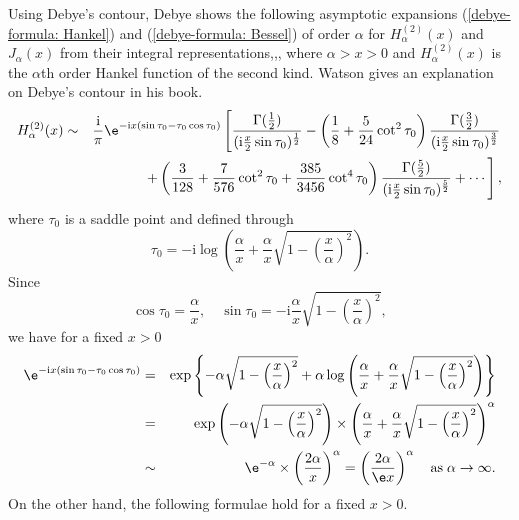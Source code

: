 \begin{rem}
\label{Debye formula}
Using Debye's contour, Debye shows the following asymptotic expansions (\ref{debye-formula: Hankel}) and (\ref{debye-formula: Bessel}) of order $\alpha$ for $H^{(2)}_{\alpha}(x)$ and $J_\alpha(x)$ from their integral representations\cite{Debye},\cite{Olver1997},\cite{Watson1966}, where $\alpha>x>0$ and $H^{(2)}_{\alpha}(x)$ is the $\alpha$th order Hankel function of the second kind. Watson gives an explanation on Debye's contour in his book\cite{Watson1966}.
\begin{eqnarray}
H^{(2)}_{\alpha}(x)&\sim&\frac{\mathrm{i}}{\pi}\e^{-\mathrm{i}x(\sin\tau_0-\tau_0\cos\tau_0)}\left[\frac{\Gamma(\frac{1}{2})}{(\mathrm{i}\frac{x}{2}\sin\tau_0)^{\frac{1}{2}}}-\left(\frac{1}{8}+\frac{5}{24}\cot^2\tau_0\right)\frac{\Gamma(\frac{3}{2})}{(\mathrm{i}\frac{x}{2}\sin\tau_0)^{\frac{3}{2}}}\right. \nonumber\\
&&\left.+\left(\frac{3}{128}+\frac{7}{576}\cot^2\tau_0+\frac{385}{3456}\cot^4\tau_0\right)\frac{\Gamma(\frac{5}{2})}{(\mathrm{i}\frac{x}{2}\sin\tau_0)^{\frac{5}{2}}}+\cdots\right],
\label{debye-formula: Hankel}
\end{eqnarray}
where $\tau_0$ is a saddle point and defined through
\begin{equation}
\tau_0=-\mathrm{i}\log\left(\frac{\alpha}{x}+\frac{\alpha}{x}\sqrt{1-\left(\frac{x}{\alpha}\right)^2}\right).
\label{tau_0}
\end{equation}
Since 
\begin{displaymath}
\cos\tau_0=\frac{\alpha}{x}, \quad \sin\tau_0=-\mathrm{i}\frac{\alpha}{x}\sqrt{1-\left(\frac{x}{\alpha}\right)^2},
\end{displaymath}
we have for a fixed $x>0$
\begin{eqnarray*}
\e^{-\mathrm{i}x(\sin\tau_0-\tau_0\cos\tau_0)}&=&\exp\left\{-\alpha\sqrt{1-\left(\frac{x}{\alpha}\right)^2}+\alpha\log\left(\frac{\alpha}{x}+\frac{\alpha}{x}\sqrt{1-\left(\frac{x}{\alpha}\right)^2}\right)\right\} \\
&=&\exp\left(-\alpha\sqrt{1-\left(\frac{x}{\alpha}\right)^2}\right) \times \left(\frac{\alpha}{x}+\frac{\alpha}{x}\sqrt{1-\left(\frac{x}{\alpha}\right)^2}\right)^\alpha \\
&\sim& \e^{-\alpha} \times \left(\frac{2\alpha}{x}\right)^\alpha=\left(\frac{2\alpha}{\e x}\right)^\alpha \quad {\rm as}\;\alpha\rightarrow\infty.
\end{eqnarray*}
On the other hand, the following formulae hold for a fixed $x>0$.
\begin{displaymath}

\end{displaymath}
\end{rem}
